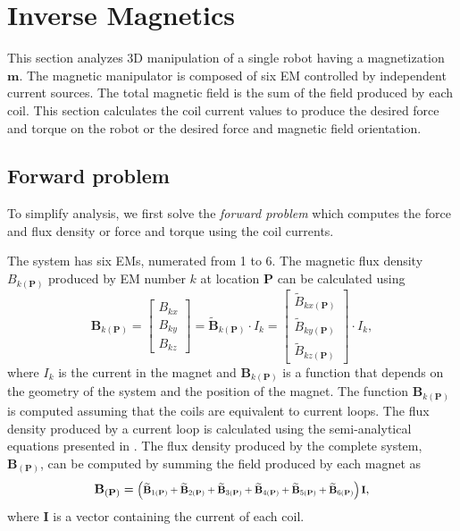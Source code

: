\section{Inverse Magnetics}\label{sec:invMagnetics}
This section analyzes 3D manipulation of a single robot having a magnetization $\mathbf{m}$. The magnetic manipulator is composed of six EM controlled by independent current sources. The total magnetic field is the sum of the field produced by each coil.
 This section calculates the coil current values to produce the desired force and torque on the robot or the desired force and magnetic field orientation.

\subsection{Forward problem} \label{Forward}
To simplify analysis, we first solve the \emph{forward problem} which computes the force and flux density or force and torque using the coil currents. 

The system has six EMs, numerated from 1 to 6.
The magnetic flux density $B_{k(\mathbf{P})}$ produced by EM number $k$ at location $\mathbf{P}$ can be calculated using 
%
\begin{equation}
\mathbf{B}_{k(\mathbf{P})}=\begin{bmatrix}
B_{kx}
\\
B_{ky} 
\\ 
B_{kz}
\end{bmatrix}=\mathbf{\widetilde{B}}_{k(\mathbf{P})}\cdot I_k=
\begin{bmatrix}
{\widetilde{B}}_{kx(\mathbf{P})}
\\
{\widetilde{B}}_{ky(\mathbf{P})}
\\ 
{\widetilde{B}}_{kz(\mathbf{P})}

\end{bmatrix}\cdot I_k,
\label{FieldEq}
\end{equation}
%
 where $I_k$ is the current in the magnet and $\mathbf{B}_{k(\mathbf{P})}$ is a function that depends on the geometry of the system and the position of the magnet. The function $\mathbf{B}_{k(\mathbf{P})}$ is computed assuming that the coils are equivalent to current loops. The flux density produced by a current loop is calculated using the semi-analytical equations presented in \cite{simpson2001simple}.
The flux density produced by the complete system, $\mathbf{B}_{(\mathbf{P})}$, can be computed by summing the field produced by each magnet as
%
\begin{dmath}
\mathbf{B}_{(\mathbf{P})}= \scalebox{.8}{$\left(\mathbf{\widetilde{B}}_{1(\mathbf{P})}+\mathbf{\widetilde{B}}_{2(\mathbf{P})}+\mathbf{\widetilde{B}}_{3(\mathbf{P})}+\mathbf{\widetilde{B}}_{4(\mathbf{P})}+\mathbf{\widetilde{B}}_{5(\mathbf{P})}+\mathbf{\widetilde{B}}_{6(\mathbf{P})}\right )\mathbf{I} $},
\label{FieldTot}
\end{dmath}
%
 where $\mathbf{I}$ is a vector containing the current of each coil.

